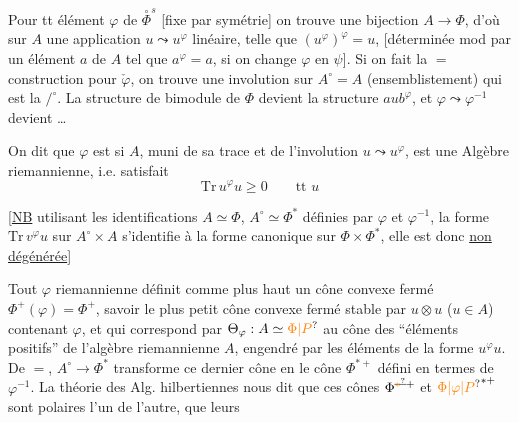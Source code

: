 Pour tt élément $\varphi$ de $\overset{\circ}{\Phi}^s$ [fixe par
symétrie] on trouve une bijection
$A\longrightarrow\Phi$, d'où sur $A$ une 
application $u\leadsto u^\varphi$ linéaire, telle que
$(u^\varphi)^\varphi=u$, [déterminée mod 
par un élément $a$ de $A$ tel que $a^\varphi=a$, si
on change $\varphi$ en $\psi$].
Si on fait la $=$ construction pour $\check\varphi$, on trouve une
involution sur $A^\circ=A$ (ensemblistement)
qui est la $\mathord{/}^{\circ}$.
La structure de  bimodule de
$\Phi$ devient la structure $aub^\varphi$, et $\varphi\leadsto\varphi^{-1}$ devient
 \ldots

On dit que  \deleted{\unsure{$\varphi$|$\Phi$}} $\varphi$ est \deleted{\unsure{$\varphi$}} \uline{} si $A$,
muni de sa trace et de l'involution $u\leadsto u^\varphi$, est
une Algèbre riemannienne, i.e. satisfait
\[
\mathrm{Tr}\,u^\varphi u\geq0\qquad \text{tt }u
\]

[\uline{NB} utilisant les identifications $A\simeq\Phi$, $A^\circ\simeq\Phi^*$
définies par $\varphi$ et $\varphi^{-1}$, la forme $\mathrm{Tr}\,v^\varphi u$
sur $A^\circ\times A$ s'identifie à la forme canonique
sur $\Phi\times\Phi^*$, elle est donc \uline{non dégénérée}]

Tout $\varphi$ riemannienne définit comme plus
haut un cône convexe fermé $\Phi^+(\varphi)=\Phi^+$,
savoir le plus petit cône convexe fermé
stable par $u\otimes u$ ($u\in A$) contenant $\varphi$, et qui
correspond par $\Theta_\varphi:A\simeq\unsure{\Phi|P}$ au cône des
``éléments positifs'' de l'algèbre  riemannienne
$A$, engendré par les éléments de la forme
$u^\varphi u$. De $=$, $A^\circ\longrightarrow\Phi^*$ transforme ce dernier
cône en le cône $\Phi^{*+}$ défini en termes
de $\varphi^{-1}$. La théorie des Alg. hilbertiennes
nous dit que ces cônes $\Phi^{\deleted{\unsure{*}}+}$ et $\unsure{\Phi|\varphi|P}^{*+}$ sont
polaires l'un de l'autre,  que leurs

